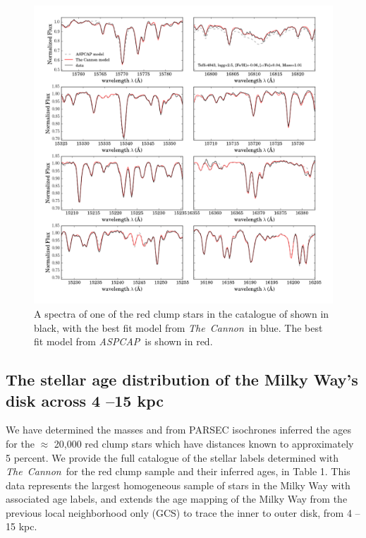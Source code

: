 \documentclass[12pt, preprint]{aastex}
\newcommand{\project}[1]{\textsl{#1}}
\newcommand{\tc}{\project{The~Cannon}}
\newcommand{\aspcap}{\project{ASPCAP}}
\begin{document}
\begin{figure}[h!]
\centering
      \includegraphics[scale=0.5]{./plots/spectra_fits_7.png}
  \caption{A spectra of one of the red clump stars in the catalogue of \citet{Bovy2014} shown in black, with the best fit model from \tc\ in blue. The best fit model from \aspcap\ is shown in red.}
\label{fig:spectra}
\end{figure}



\subsection{The stellar age distribution of the Milky Way's disk across 4 --15 kpc}

We have determined the masses and from PARSEC isochrones inferred the ages for the $\approx$ 20,000 red clump stars which have distances known to approximately 5 percent. We provide the full catalogue of the stellar labels determined with \tc\ for the red clump sample and their inferred ages, in Table 1. This data represents the largest homogeneous sample of stars in the Milky Way with associated age labels, and extends the age mapping of the Milky Way from the previous local neighborhood only (GCS) to trace the inner to outer disk, from 4 -- 15 kpc.  
\end{document}
